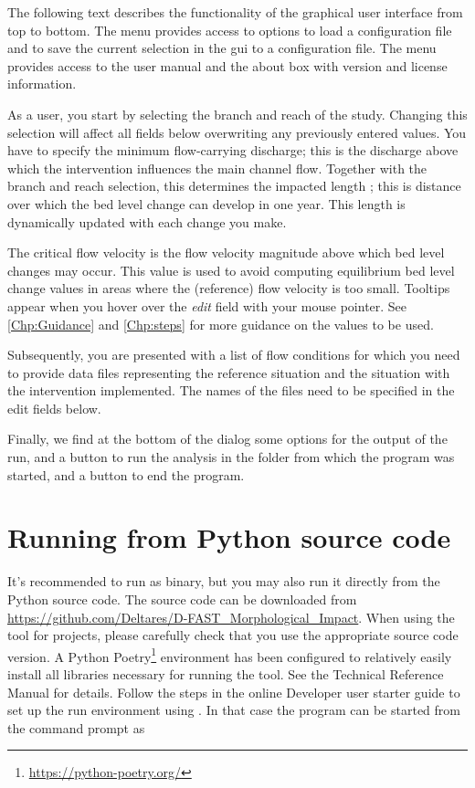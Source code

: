 The following text describes the functionality of the graphical user interface from top to bottom.
The  menu provides access to options to load a configuration file and to save the current selection in the gui to a configuration file.
The  menu provides access to the user manual and the \dfastmi about box with version and license information.

As a user, you start by selecting the branch and reach of the study.
Changing this selection will affect all fields below overwriting any previously entered values.
You have to specify the minimum flow-carrying discharge; this is the discharge \unitbrackets{\SI{}{\metre\cubed\per\second}} above which the intervention influences the main channel flow.
Together with the branch and reach selection, this determines the impacted length \unitbrackets{\SI{}{\metre}}; this is distance over which the bed level change can develop in one year.
This length \unitbrackets{\SI{}{\metre}} is dynamically updated with each change you make.

The critical flow velocity \unitbrackets{\SI{}{\metre\per\second}} is the flow velocity magnitude above which bed level changes may occur.
This value is used to avoid computing equilibrium bed level change values in areas where the (reference) flow velocity is too small.
Tooltips appear when you hover over the \emph{edit} field with your mouse pointer.
See \autoref{Chp:Guidance} and \autoref{Chp:steps} for more guidance on the values to be used.

Subsequently, you are presented with a list of flow conditions for which you need to provide data files representing the reference situation and the situation with the intervention implemented.
The names of the files need to be specified in the edit fields below.

Finally, we find at the bottom of the dialog some options for the output of the \dfastmi run, and a button to run the analysis in the folder from which the program was started, and a button to end the program.

\section{Running from Python source code}
It's recommended to run \dfastmi as binary, but you may also run it directly from the Python source code.
The source code can be downloaded from \url{https://github.com/Deltares/D-FAST_Morphological_Impact}.
When using the tool for projects, please carefully check that you use the appropriate source code version.
A Python Poetry\footnote{\url{https://python-poetry.org/}} environment has been configured to relatively easily install all libraries necessary for running the tool.
See the \dfastmi Technical Reference Manual for details.
Follow the steps in the online Developer user starter guide to set up the run environment using .
In that case the program can be started from the command prompt as

